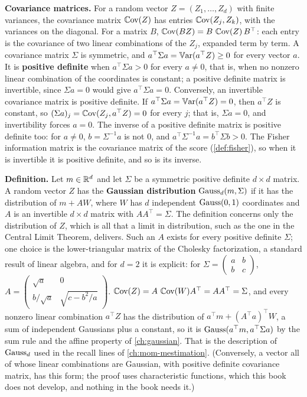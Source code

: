 \textbf{Covariance matrices.}
For a random vector $Z = (Z_1, \ldots, Z_d)$ with finite variances, the covariance matrix $\operatorname*{\mathbb{C}\text{ov}}(Z)$ has entries $\operatorname*{\mathbb{C}\text{ov}}(Z_j, Z_k)$, with the variances on the diagonal.
For a matrix $B$, $\operatorname*{\mathbb{C}\text{ov}}(BZ) = B\,\operatorname*{\mathbb{C}\text{ov}}(Z)\,B^\top$: each entry is the covariance of two linear combinations of the $Z_j$, expanded term by term.
A covariance matrix $\Sigma$ is symmetric, and $a^\top\Sigma a = \operatorname*{\mathbb{V}\text{ar}}(a^\top Z) \geq 0$ for every vector $a$.
It is \textbf{positive definite} when $a^\top\Sigma a > 0$ for every $a \neq 0$, that is, when no nonzero linear combination of the coordinates is constant; a positive definite matrix is invertible, since $\Sigma a = 0$ would give $a^\top\Sigma a = 0$.
Conversely, an invertible covariance matrix is positive definite.
If $a^\top\Sigma a = \operatorname*{\mathbb{V}\text{ar}}(a^\top Z) = 0$, then $a^\top Z$ is constant, so $(\Sigma a)_j = \operatorname*{\mathbb{C}\text{ov}}(Z_j, a^\top Z) = 0$ for every $j$; that is, $\Sigma a = 0$, and invertibility forces $a = 0$.
The inverse of a positive definite matrix is positive definite too: for $a \neq 0$, $b = \Sigma^{-1}a$ is not $0$, and $a^\top\Sigma^{-1}a = b^\top\Sigma b > 0$.
The Fisher information matrix is the covariance matrix of the score (\cref{def:fisher}), so when it is invertible it is positive definite, and so is its inverse.

\textbf{Definition.}
Let $m \in \mathbb{R}^d$ and let $\Sigma$ be a symmetric positive definite $d \times d$ matrix.
A random vector $Z$ has the \textbf{Gaussian distribution} $\text{Gauss}_d(m, \Sigma)$ if it has the distribution of $m + AW$, where $W$ has $d$ independent $\text{Gauss}(0, 1)$ coordinates and $A$ is an invertible $d \times d$ matrix with $AA^\top = \Sigma$.
The definition concerns only the distribution of $Z$, which is all that a limit in distribution, such as the one in the Central Limit Theorem, delivers.
Such an $A$ exists for every positive definite $\Sigma$; one choice is the lower-triangular matrix of the Cholesky factorization, a standard result of linear algebra, and for $d = 2$ it is explicit: for $\Sigma = \begin{pmatrix} a & b \\ b & c\end{pmatrix}$, $A = \begin{pmatrix} \sqrt{a} & 0 \\ b/\sqrt{a} & \sqrt{c - b^2/a}\end{pmatrix}$.
$\operatorname*{\mathbb{C}\text{ov}}(Z) = A\,\operatorname*{\mathbb{C}\text{ov}}(W)A^\top = AA^\top = \Sigma$, and every nonzero linear combination $a^\top Z$ has the distribution of $a^\top m + (A^\top a)^\top W$, a sum of independent Gaussians plus a constant, so it is $\text{Gauss}(a^\top m, a^\top\Sigma a)$ by the sum rule and the affine property of \cref{ch:gaussian}.
That is the description of $\text{Gauss}_d$ used in the recall lines of \cref{ch:mom-mestimation}.
(Conversely, a vector all of whose linear combinations are Gaussian, with positive definite covariance matrix, has this form; the proof uses characteristic functions, which this book does not develop, and nothing in the book needs it.)

